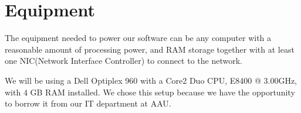 \section{Equipment}
\label{sec:equipment}
The equipment needed to power our software can be any computer with a reasonable amount of processing power, and RAM storage together with at least one NIC(Network Interface Controller) to connect to the network.

We will be using a Dell Optiplex 960 with a Core2 Duo CPU, E8400 @ 3.00GHz, with 4 GB RAM installed.
We chose this setup because we have the opportunity to borrow it from our IT department at AAU.
